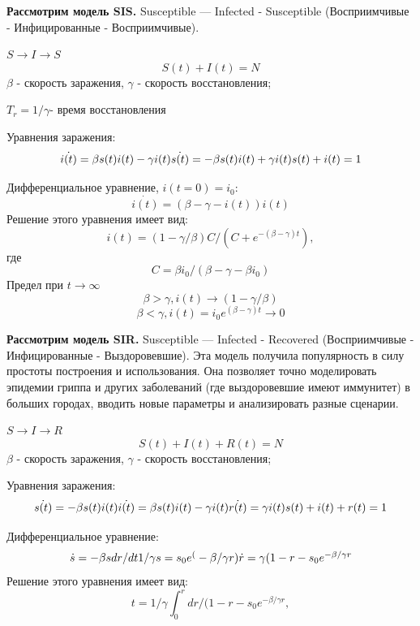 \textbf{Рассмотрим модель SIS.}
Susceptible — Infected - Susceptible (Восприимчивые - Инфицированные - Восприимчивые).

$S \rightarrow I \rightarrow S$
\begin{equation}
    S(t) + I(t) =N
    \end{equation}
$\beta$ - скорость заражения,
$\gamma$ - скорость восстановления;

$T_r= 1/\gamma$- время восстановления

Уравнения заражения:
\begin{equation}
    \dot{i(t)}=\beta s(t)i(t) -\gamma i(t)
    $$ $$
    \dot{s(t)}= - \beta s(t)i(t)+\gamma i(t)
    $$ $$
    s(t) +i(t) = 1
    \end{equation}

Дифференциальное уравнение,  $i(t = 0) =i_0$:
\begin{equation}
    \dot{i(t)}=(\beta- \gamma - i(t))i(t)
 \end{equation}
Решение этого уравнения имеет вид:
$$i(t) = (1-\gamma / \beta )C/(C+e^{-(\beta -\gamma)t}),$$
где $$C = \beta i_0/(\beta - \gamma -\beta i_0)$$
Предел при $ t \rightarrow \infty $
$$ \beta >\gamma , i(t) \rightarrow (1 -\gamma / \beta)$$
$$ \beta < \gamma ,i(t) = i_0 e^{(\beta -\gamma)t} \rightarrow 0$$



\textbf{Рассмотрим модель SIR.}
Susceptible — Infected - Recovered (Восприимчивые - Инфицированные - Выздоровевшие).
Эта модель получила популярность в силу простоты построения и использования. Она позволяет точно моделировать эпидемии гриппа и других заболеваний (где выздоровевшие имеют иммунитет) в больших городах, вводить новые параметры и анализировать разные сценарии.

$S \rightarrow I \rightarrow R$
\begin{equation}
    S(t) + I(t) + R(t) = N
    \end{equation}
$\beta$ - скорость заражения,
$\gamma$ - скорость восстановления;

Уравнения заражения:
\begin{equation}
    \dot{s(t)}= - \beta s(t)i(t)
    $$ $$
    \dot{i(t)}=\beta s(t)i(t) -\gamma i(t)
    $$ $$
    \dot{r(t)} = \gamma i(t)
    $$ $$
    s(t) +i(t) + r(t) = 1
    \end{equation}

Дифференциальное уравнение:
\begin{equation}
    \dot{s}=-\beta s dr/dt 1/\gamma
    $$ $$
    s = s_0 e^(-\beta/\gamma r)
    \dot{r} = \gamma(1-r-s_0 e^{-\beta/\gamma r}
 \end{equation}
Решение этого уравнения имеет вид:
$$ t = 1/\gamma \int_0^r dr/(1-r-s_0 e^{-\beta / \gamma r},$$


